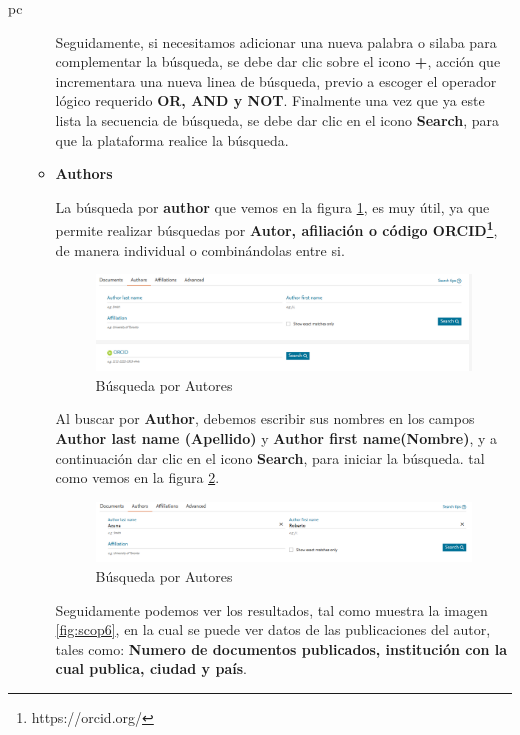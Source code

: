 pc\documentclass[a4paper,12pt,openany]{book}
\begin{document}
\begin{itemize}
\begin{itemize}
Seguidamente, si necesitamos adicionar una nueva palabra o silaba para complementar la búsqueda, se debe dar clic sobre el icono \textbf{+}, acción que incrementara una nueva linea de búsqueda, previo a escoger el operador lógico requerido \textbf{OR, AND y NOT}. Finalmente una vez que ya este lista la secuencia de búsqueda, se debe dar clic en el icono \textbf{Search}, para que la plataforma realice la búsqueda. 

    \item \textbf{Authors}

La búsqueda por \textbf{author} que vemos en la figura \ref{fig:scop4}, es muy útil, ya que permite realizar búsquedas por \textbf{Autor, afiliación o código ORCID\footnote{https://orcid.org/}}, de manera individual o combinándolas entre si.

        \begin{figure}[H]
        \centering
    	\includegraphics[width=12cm]{Scop4.png}
        \caption{Búsqueda por Autores}
        \label{fig:scop4}
        \end{figure}
        
Al buscar por \textbf{Author}, debemos escribir sus nombres en los campos \textbf{Author last name (Apellido)} y  
\textbf{Author first name(Nombre)}, y a continuación dar clic en el icono \textbf{Search}, para iniciar la búsqueda. tal como vemos en la figura \ref{fig:scop5}.  

        \begin{figure}[H]
        \centering
    	\includegraphics[width=12cm]{Scop5.png}
        \caption{Búsqueda por Autores}
        \label{fig:scop5}
        \end{figure}

Seguidamente podemos ver los resultados, tal como muestra la imagen \ref{fig:scop6}, en la cual se puede ver datos de las publicaciones del autor, tales como: \textbf{Numero de documentos publicados, institución con la cual publica, ciudad y país}.


\end{itemize}
\end{itemize}
\end{document}
